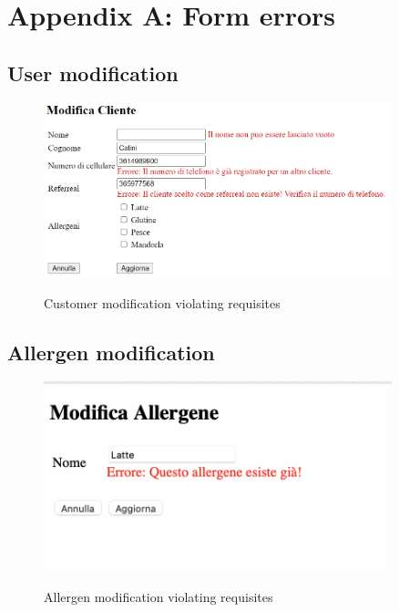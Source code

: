 \documentclass{article}
\begin{document}
    \newpage
    \section*{Appendix A: Form errors}


    \vspace*{5mm}

    \subsection*{User modification}
    \begin{figure}[H]
        \centering
        \includegraphics[width=0.9\textwidth]{images/customer_validation_error.jpg}
        \label{fig:customer_validation_error}
        \caption{Customer modification violating requisites}
    \end{figure}

    \vspace*{5mm}

    \subsection*{Allergen modification}
    \begin{figure}[H]
        \centering
        \includegraphics[width=0.9\textwidth]{images/allergen_validation_error.png}
        \label{fig:allergen_validation_error}
        \caption{Allergen modification violating requisites}
    \end{figure}
\end{document}
